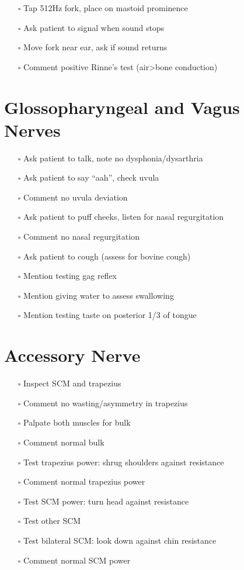 \documentclass[
  13.5pt,
  a4paper,
  DIV=11,
  numbers=noendperiod]{scrreprt}
\providecommand{\tightlist}{%
  \setlength{\itemsep}{0pt}\setlength{\parskip}{0pt}}
\begin{document}
\begin{itemize}
\tightlist
\item[$\square$]
  Tap 512Hz fork, place on mastoid prominence
\item[$\square$]
  Ask patient to signal when sound stops
\item[$\square$]
  Move fork near ear, ask if sound returns
\item[$\square$]
  Comment positive Rinne's test (air\textgreater bone conduction)
\end{itemize}

\section{Glossopharyngeal and Vagus
Nerves}\label{glossopharyngeal-and-vagus-nerves}

\begin{itemize}
\tightlist
\item[$\square$]
  Ask patient to talk, note no dysphonia/dysarthria
\item[$\square$]
  Ask patient to say ``aah'', check uvula
\item[$\square$]
  Comment no uvula deviation
\item[$\square$]
  Ask patient to puff cheeks, listen for nasal regurgitation
\item[$\square$]
  Comment no nasal regurgitation
\item[$\square$]
  Ask patient to cough (assess for bovine cough)
\item[$\square$]
  Mention testing gag reflex
\item[$\square$]
  Mention giving water to assess swallowing
\item[$\square$]
  Mention testing taste on posterior 1/3 of tongue
\end{itemize}

\section{Accessory Nerve}\label{accessory-nerve}

\begin{itemize}
\tightlist
\item[$\square$]
  Inspect SCM and trapezius
\item[$\square$]
  Comment no wasting/asymmetry in trapezius
\item[$\square$]
  Palpate both muscles for bulk
\item[$\square$]
  Comment normal bulk
\item[$\square$]
  Test trapezius power: shrug shoulders against resistance
\item[$\square$]
  Comment normal trapezius power
\item[$\square$]
  Test SCM power: turn head against resistance
\item[$\square$]
  Test other SCM
\item[$\square$]
  Test bilateral SCM: look down against chin resistance
\item[$\square$]
  Comment normal SCM power
\end{itemize}
\end{document}
